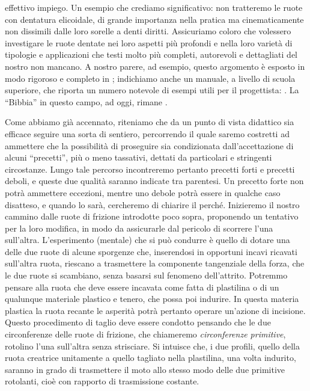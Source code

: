 effettivo impiego. Un esempio che crediamo significativo:
non tratteremo le ruote con dentatura elicoidale, di grande importanza
nella pratica ma cinematicamente non dissimili dalle loro sorelle
a denti diritti.
Assicuriamo coloro che volessero
investigare le ruote dentate nei loro
aspetti pi\`u profondi e nella loro variet\`a di tipologie e applicazioni
che testi molto pi\`u completi, autorevoli e dettagliati
del nostro non mancano. A nostro parere, ad esempio,
questo argomento \`e esposto in modo rigoroso e completo in
\cite{pellicano}; indichiamo anche un manuale, a livello di scuola superiore,
che riporta un numero notevole di esempi utili per 
il progettista: \cite{punzi}. La ``Bibbia'' in questo campo, ad oggi, rimane \cite{henriot}.

\noindent Come abbiamo gi\`a accennato, riteniamo che
da un punto di vista didattico
sia efficace seguire una sorta di sentiero, percorrendo il quale
saremo costretti ad ammettere
che la possibilit\`a di proseguire sia condizionata dall'accettazione
di alcuni ``precetti'', pi\`u o meno tassativi, dettati da particolari
e stringenti circostanze.
Lungo tale percorso incontreremo pertanto
precetti forti e precetti deboli, e queste due qualit\`a saranno indicate tra
parentesi. Un precetto forte non potr\`a ammettere eccezioni, mentre uno
debole potr\`a essere in qualche caso disatteso, e quando lo sar\`a,
cercheremo di chiarire il perch\'e.
Inizieremo il nostro cammino dalle
ruote di frizione introdotte poco sopra, proponendo
un tentativo per la loro modifica,
in modo da assicurarle dal pericolo di
scorrere l'una sull'altra.
L'esperimento (mentale) che si pu\`o condurre \`e quello
di dotare una delle due ruote di alcune sporgenze che, inserendosi
in opportuni incavi ricavati sull'altra ruota, riescano a trasmettere
la componente tangenziale della forza, che le due ruote si scambiano,
senza basarsi sul fenomeno dell'attrito. Potremmo 
pensare alla ruota che deve essere incavata come fatta di plastilina
o di un qualunque materiale plastico e tenero, che possa poi indurire.
In questa materia plastica la ruota recante le asperit\`a potr\`a
pertanto operare un'azione
di incisione. Questo procedimento di taglio deve essere
condotto pensando che le due circonferenze delle ruote di frizione, 
che chiameremo {\em circonferenze primitive},
rotolino l'una sull'altra senza strisciare. Si intuisce che,
i due profili, quello della ruota creatrice
unitamente a quello tagliato nella plastilina,
una volta indurito, saranno
in grado di trasmettere il moto allo stesso modo delle due primitive
rotolanti, cio\`e con rapporto di trasmissione
costante.

